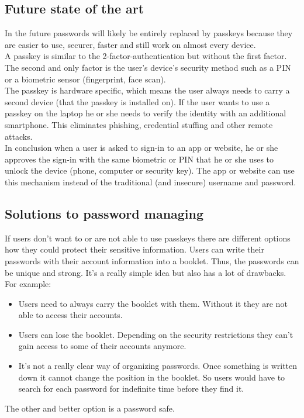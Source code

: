 \documentclass[conference]{IEEEtran}
\begin{document}
\subsection{Future state of the art}
In the future passwords will likely be entirely replaced by passkeys because they are easier to use, securer, faster and still work on almost every device.\\
A passkey is similar to the 2-factor-authentication but without the first factor. The second and only factor is the user's device's security method such as a PIN or a biometric sensor (fingerprint, face scan). \\
The passkey is hardware specific, which means the user always needs to carry a second device (that the passkey is installed on). If the user wants to use a passkey on the laptop he or she needs to verify the identity with an additional smartphone. This eliminates phishing, credential stuffing and other remote attacks. \\
In conclusion when a user is asked to sign-in to an app or website, he or she approves the sign-in with the same biometric or PIN that he or she uses to unlock the device (phone, computer or security key). The app or website can use this mechanism instead of the traditional (and insecure) username and password. \cite{b5}

\subsection{Solutions to password managing}
If users don't want to or are not able to use passkeys there are different options how they could protect their sensitive information. Users can write their passwords with their account information into a booklet. Thus, the passwords can be unique and strong. It's a really simple idea but also has a lot of drawbacks. 
For example:
\begin{itemize}
\item Users need to always carry the booklet with them. Without it they are not able to access their accounts.
\item Users can lose the booklet. Depending on the security restrictions they can't gain access to some of their accounts anymore.
\item It's not a really clear way of organizing passwords. Once something is written down it cannot change the position in the booklet. So users would have to search for each password for indefinite time before they find it.
\end{itemize}
The other and better option is a password safe.  
\end{document}
